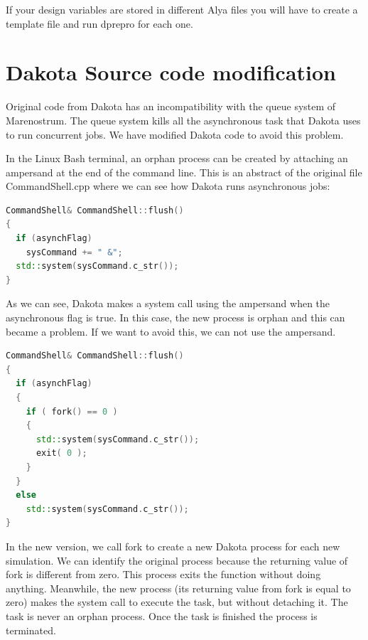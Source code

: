 \documentclass[12pt,a4paper,article]{memoir}
\begin{document}
If your design variables are stored in different Alya files you will have to create a template file and run dprepro for each one.

\appendix

\chapter{Dakota Source code modification}
\label{chapter:CodeMod}

Original code from Dakota has an incompatibility with the queue system of Marenostrum. The queue system kills all the asynchronous task that Dakota uses to run concurrent jobs. We have modified Dakota code to avoid this problem.

In the Linux Bash terminal, an orphan process can be created by attaching an ampersand at the end of the command line. This is an abstract of the original file CommandShell.cpp where we can see how Dakota runs asynchronous jobs:

\begin{lstlisting}[style=MyCodeStyle,language=C++]
CommandShell& CommandShell::flush()
{
  if (asynchFlag)
    sysCommand += " &";
  std::system(sysCommand.c_str());
}
\end{lstlisting}

As we can see, Dakota makes a system call using the ampersand when the asynchronous flag is true. In this case, the new process is orphan and this can became a problem. If we want to avoid this, we can not use the ampersand.

\begin{lstlisting}[style=MyCodeStyle,language=C++]
CommandShell& CommandShell::flush()
{
  if (asynchFlag)
  {
    if ( fork() == 0 )
    {
      std::system(sysCommand.c_str());
      exit( 0 );
    }
  }
  else
    std::system(sysCommand.c_str());
}
\end{lstlisting}

In the new version, we call fork to create a new Dakota process for each new simulation. We can identify the original process because the returning value of fork is different from zero. This process exits the function without doing anything. Meanwhile, the new process (its returning value from fork is equal to zero) makes the system call to execute the task, but without detaching it. The task is never an orphan process. Once the task is finished the process is terminated.
\end{document}
